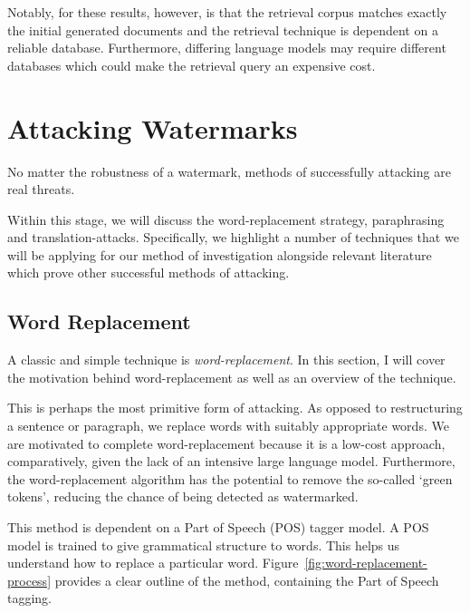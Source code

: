 \documentclass{l4proj}
\theoremstyle{definition}
\begin{document}
        Notably, for these results, however, is that the retrieval corpus matches exactly the initial generated documents and the retrieval technique is dependent on a reliable database. Furthermore, differing language models may require different databases which could make the retrieval query an expensive cost. 

\section{Attacking Watermarks}
        No matter the robustness of a watermark, methods of successfully attacking are real threats. 

        Within this stage, we will discuss the word-replacement strategy, paraphrasing and translation-attacks. Specifically, we highlight a number of techniques that we will be applying for our method of investigation alongside relevant literature which prove other successful methods of attacking.

    \subsection{Word Replacement}
        A classic and simple technique is \emph{word-replacement}. In this section, I will cover the motivation behind word-replacement as well as an overview of the technique.

        This is perhaps the most primitive form of attacking. As opposed to restructuring a sentence or paragraph, we replace words with suitably appropriate words. We are motivated to complete word-replacement because it is a low-cost approach, comparatively, given the lack of an intensive large language model. Furthermore, the word-replacement algorithm has the potential to remove the so-called `green tokens', reducing the chance of being detected as watermarked.  

        This method is dependent on a Part of Speech (POS) tagger model. A POS model is trained to give grammatical structure to words. This helps us understand how to replace a particular word. Figure~\ref{fig:word-replacement-process} provides a clear outline of the method, containing the Part of Speech tagging. 
\end{document}
